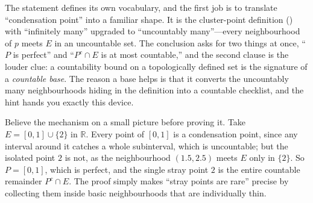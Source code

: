 \documentclass[main.tex]{subfiles}
\begin{document}
\begin{Reflection}
The statement defines its own vocabulary, and the first job is to translate ``condensation point'' into
a familiar shape. It is the cluster-point definition () with ``infinitely many'' upgraded to
``uncountably many''---every neighbourhood of $p$ meets $E$ in an uncountable set. The conclusion asks
for two things at once, ``$P$ is perfect'' and ``$P^{c}\cap E$ is at most countable,'' and the second
clause is the louder clue: a countability bound on a topologically defined set is the signature of a
\emph{countable base}. The reason a base helps is that it converts the uncountably many neighbourhoods
hiding in the definition into a countable checklist, and the hint hands you exactly this device.

Believe the mechanism on a small picture before proving it. Take $E=[0,1]\cup\{2\}$ in $\mathbb R$. Every
point of $[0,1]$ is a condensation point, since any interval around it catches a whole subinterval, which
is uncountable; but the isolated point $2$ is not, as the neighbourhood $(1.5,2.5)$ meets $E$ only in
$\{2\}$. So $P=[0,1]$, which is perfect, and the single stray point $2$ is the entire countable
remainder $P^{c}\cap E$. The proof simply makes ``stray points are rare'' precise by collecting them
inside basic neighbourhoods that are individually thin.


\end{Reflection}
\end{document}
